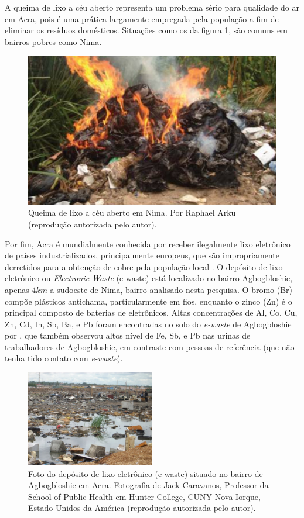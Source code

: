 A queima de lixo a céu aberto representa um problema sério para qualidade do
ar em Acra, pois é uma prática largamente empregada pela população a fim de 
eliminar os resíduos domésticos. Situações como os da figura \ref{fig:nima_lixo}, 
são comuns em bairros pobres como Nima.  

\begin{figure}[H]
  \centering
    \includegraphics[width=0.5\linewidth]{../inputs/images/zheng/arku3.jpeg}
    \caption{Queima de lixo a céu aberto em Nima. Por Raphael Arku 
           (reprodução autorizada pelo autor).\label{fig:nima_lixo}}
\end{figure} 

Por fim, Acra é mundialmente conhecida por receber ilegalmente lixo 
eletrônico de países industrializados, principalmente europeus, 
que são impropriamente derretidos para a obtenção de cobre pela população local
\citep{asampong2015}. 
O depósito de lixo eletrônico ou \textit{Electronic Waste} (e-waste) está 
localizado no bairro Agbogbloshie, apenas $4 km$ a sudoeste de 
Nima, bairro analisado nesta pesquisa. 
O bromo (Br) compõe plásticos antichama, particularmente em fios, enquanto o 
zinco (Zn) é o principal composto de baterias de eletrônicos. 
Altas concentrações de Al, Co, Cu, Zn, Cd, In, Sb, Ba, e Pb foram encontradas 
no solo do \textit{e-waste} de Agbogbloshie por \citet{asante2012}, 
que também observou altos nível de Fe, Sb, e Pb nas urinas de trabalhadores 
de Agbogbloshie, em contraste com pessoas de referência
(que não tenha tido contato com \textit{e-waste}).

\begin{figure}[H]
  \centering
  \includegraphics[width=0.5\textwidth]{../inputs/images/ewaste_jack_caravano.jpg}
  \caption{Foto do depósito de lixo eletrônico (e-waste) situado no bairro 
           de Agbogbloshie em Acra. Fotografia de Jack Caravanos, 
           Professor da School of Public Health em Hunter College, CUNY
           Nova Iorque, Estado Unidos da América 
           (reprodução autorizada pelo autor). \label{fig:ewaste}}
\end{figure}

